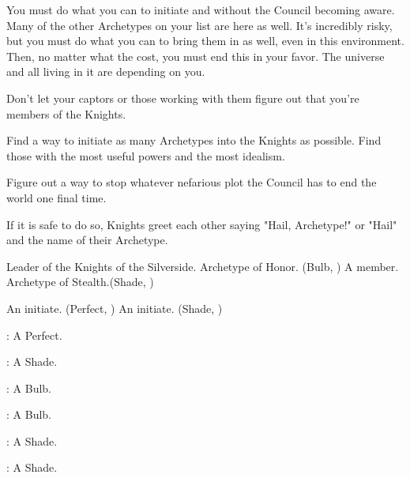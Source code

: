 \documentclass[blue]{Silversiders}
\begin{document}
You must do what you can to initiate \cTruth{} and \cWisdom{} without the Council becoming aware. Many of the other Archetypes on your list are here as well. It's incredibly risky, but you must do what you can to bring them in as well, even in this environment. Then, no matter what the cost, you must end this in your favor. The universe and all living in it are depending on you.

\begin{itemz}[Goals]
  \item Don't let your captors or those working with them figure out that you're members of the Knights.
  \item Find a way to initiate as many Archetypes into the Knights as possible. Find those with the most useful powers and the most idealism.
  \item Figure out a way to stop whatever nefarious plot the Council has to end the world one final time.
\end{itemz}

\begin{itemz}[Miscellaneous]
  \item If it is safe to do so, Knights greet each other saying "Hail, Archetype!" or "Hail" and the name of their Archetype.
\end{itemz}

\begin{members}
	\member{\cHonor{}} Leader of the Knights of the Silverside. Archetype of Honor. (Bulb, \cHonor{\Sex})
	\member{\cTraitor{}} A member. Archetype of Stealth.(Shade, \cTraitor{\Sex})
	
\end{members}

\begin{members}[Initiates]
	\member{\cTruth{}} An initiate. (Perfect, \cTruth{\Sex})
	\member{\cWisdom{}} An initiate. (Shade, \cWisdom{\Sex})
	
\end{members}

\begin{itemz}
	\item \cMuscle{}: A \cMuscle{\sex} Perfect.
	\item \cIngenuity{}: A \cIngenuity{\sex} Shade.
	\item \cOutcast{}: A \cOutcast{\sex} Bulb.
	\item \cCaregiver{}: A \cCaregiver{\sex} Bulb.
	\item \cLove{}: A \cLove{\sex} Shade.
	\item \cTrickster{}: A \cTrickster{\sex} Shade.

\end{itemz}
\end{document}
